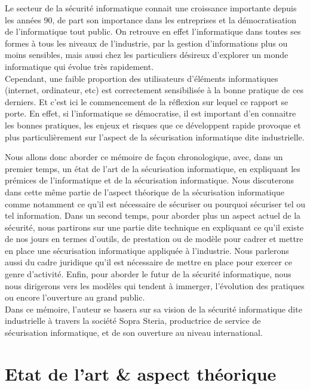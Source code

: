 \documentclass[a4paper]{memoir}
\begin{document}
Le secteur de la sécurité informatique connait une croissance importante depuis les années 90, de part son importance dans les entreprises et la démocratisation de l'informatique tout public. On retrouve en effet l'informatique dans toutes ses formes à tous les niveaux de l'industrie, par la gestion d'informations plus ou moins sensibles, mais aussi chez les particuliers désireux d'explorer un monde informatique qui évolue très rapidement.\\

Cependant, une faible proportion des utilisateurs d'éléments informatiques (internet, ordinateur, etc) est correctement sensibilisée à la bonne pratique de ces derniers. Et c'est ici le commencement de la réflexion sur lequel ce rapport se porte. En effet, si l'informatique se démocratise, il est important d'en connaitre les bonnes pratiques, les enjeux et risques que ce développent rapide provoque et plus particulièrement sur l'aspect de la sécurisation informatique dite industrielle.

Nous allons donc aborder ce mémoire de façon chronologique, avec, dans un premier temps, un état de l'art de la sécurisation informatique, en expliquant les prémices de l'informatique et de la sécurisation informatique. Nous discuterons dans cette même partie de l'aspect théorique de la sécurisation informatique comme notamment ce qu'il est nécessaire de sécuriser ou pourquoi sécuriser tel ou tel information.
Dans un second temps, pour aborder plus un aspect actuel de la sécurité, nous partirons sur une partie dite technique en expliquant ce qu'il existe de nos jours en termes d'outils, de prestation ou de modèle pour cadrer et mettre en place une sécurisation informatique appliquée à l'industrie. Nous parlerons aussi du cadre juridique qu'il est nécessaire de mettre en place pour exercer ce genre d'activité. Enfin, pour aborder le futur de la sécurité informatique, nous nous dirigerons vers les modèles qui tendent à immerger, l'évolution des pratiques ou encore l'ouverture au grand public.\\

Dans ce mémoire, l'auteur se basera sur sa vision de la sécurité informatique dite industrielle à travers la société Sopra Steria, productrice de service de sécurisation informatique, et de son ouverture au niveau international.



\part{Etat de l'art \& aspect théorique}
\end{document}
